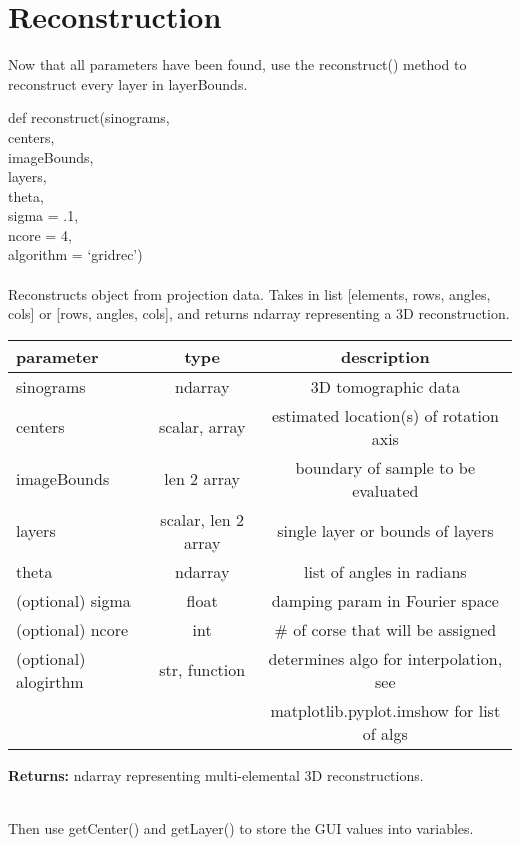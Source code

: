 \documentclass[10pt]{article}
\begin{document}
\section{Reconstruction}
Now that all parameters have been found, use the reconstruct() method to reconstruct every layer in layerBounds.
\begin{center} def reconstruct(sinograms,\\ centers,\\ imageBounds,\\ layers,\\ theta,\\ sigma = .1,\\ ncore = 4,\\ algorithm = `gridrec')\\
\ \\ Reconstructs object from projection data.
Takes in list [elements, rows, angles, cols]
or [rows, angles, cols],
and returns ndarray representing a 3D reconstruction.

\begin{table}[H]
    \centering
    \begin{tabular}{|l|c|c|}
        \hline
        \textbf{parameter} & \textbf{type} &\textbf{description}  \\ \hline
        sinograms&ndarray&3D tomographic data\\ \hline
        centers&scalar, array&estimated location(s) of rotation axis\\ \hline
        imageBounds&len 2 array&boundary of sample to be evaluated\\ \hline
        layers&scalar, len 2 array&single layer or bounds of layers\\ \hline
        theta&ndarray&list of angles in radians\\ \hline
        (optional) sigma&float&damping param in Fourier space\\ \hline
        (optional) ncore&int& \# of corse that will be assigned\\ \hline
        (optional) alogirthm&{str, function}&determines algo for interpolation, see\\
        & & matplotlib.pyplot.imshow for list of algs \\ \hline
    \end{tabular}
\end{table}
\textbf{Returns:} ndarray representing multi-elemental 3D reconstructions.\\
\end{center}
\ \\Then use getCenter() and getLayer() to store the GUI values into variables.
\end{document}
